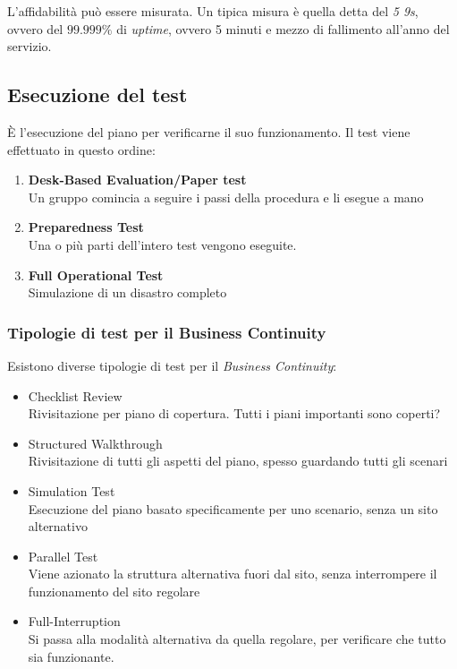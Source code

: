L'affidabilità può essere misurata. Un tipica misura è quella detta del 
\textit{5 9s}, ovvero del $99.999\%$ di \textit{uptime}, ovvero 5 minuti e 
mezzo di fallimento all'anno del servizio.

\subsection{Esecuzione del test}

È l'esecuzione del piano per verificarne il suo funzionamento.
Il test viene effettuato in questo ordine:
\begin{enumerate}
  \item \textbf{Desk-Based Evaluation/Paper test} \\
  Un gruppo comincia a seguire i passi della procedura e li esegue a mano
  \item \textbf{Preparedness Test} \\
  Una o più parti dell'intero test vengono eseguite.
  \item \textbf{Full Operational Test} \\
  Simulazione di un disastro completo
\end{enumerate}

\subsubsection{Tipologie di test per il Business Continuity}

Esistono diverse tipologie di test per il \textit{Business Continuity}:
\begin{itemize}
  \item Checklist Review \\
  Rivisitazione per piano di copertura. Tutti i piani importanti sono coperti?
  \item Structured Walkthrough \\
  Rivisitazione di tutti gli aspetti del piano, spesso guardando tutti gli 
  scenari
  \item Simulation Test \\
  Esecuzione del piano basato specificamente per uno scenario, senza un sito 
  alternativo
  \item Parallel Test \\
  Viene azionato la struttura alternativa fuori dal sito, senza 
  interrompere il funzionamento del sito regolare
  \item Full-Interruption \\
  Si passa alla modalità alternativa da quella regolare, per verificare che 
  tutto sia funzionante.
\end{itemize}

